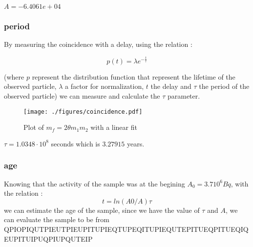 \documentclass[a4paper,12pt,oneside]{article}
\def \be {\begin{equation}}
\def \ee {\end{equation}}
\begin{document}
	$A = -6.4061e+04 $




	



\subsubsection{period}

	By measuring the coincidence with a delay, using the relation :

	\be
		p(t)= \lambda e^{-\frac{t}{\tau}}
	\ee

	(where $p$ represent the distribution function that represent the lifetime of the observed particle, $\lambda$ a factor for normalization, $t$ the delay and $\tau$ the period of the observed particle) we can measure and calculate the $\tau$ parameter. 


	\begin{figure}[h!]
		\begin{center}
		\texttt{[image: ./figures/coincidence.pdf]}
		\caption{Plot of $	m_f = 2\theta m_1 m_2$ with a linear fit} \label{fig:2theta}
		\end{center}
	\end{figure}


	$\tau = 1.0348 \cdot 10^8$ seconds which is $3.27915$ years.

\subsubsection{age}

	Knowing that the activity of the sample was at the begining $A_0 = 3.7 10^6 Bq$, with the relation :
	\be
		t=ln(A0/A)\tau
	\ee
	we can estimate the age of the sample, since we have the value of $\tau$ and $A$, we can evaluate the sample to be from QPIOPIQUTPIEUTPIEUPITUPIEQTUPEQITUPIEQUTEPITUEQPITUEQIQEUPITUIPUQPIUPQUTEIP 


\end{document}
